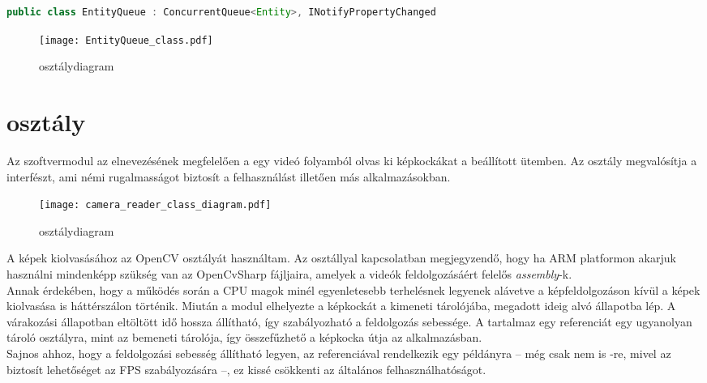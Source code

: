\begin{mdframed}[backgroundcolor=gray!20]
\begin{small}
\begin{scriptsize}
\begin{lstlisting}[language=java]
public class EntityQueue : ConcurrentQueue<Entity>, INotifyPropertyChanged
\end{lstlisting}
\end{scriptsize}
\end{small}
\end{mdframed}

\begin{figure}[h]
\texttt{[image: EntityQueue\_class.pdf]}
\centering
\caption{ osztálydiagram}
\label{fig:entity_queue_class_diagram}
\end{figure}

\section{ osztály}

Az szoftvermodul az elnevezésének megfelelően a egy videó folyamból olvas ki képkockákat a beállított ütemben. Az osztály megvalósítja a  interfészt, ami némi rugalmasságot biztosít a felhasználást illetően más alkalmazásokban. \newpage
\begin{wrapfigure}{r}{7.5cm}
\texttt{[image: camera\_reader\_class\_diagram.pdf]}
\caption{ osztálydiagram}\label{fig:camera_reader_class_diagram}
\end{wrapfigure} 
A képek kiolvasásához az OpenCV  osztályát használtam. Az osztállyal kapcsolatban megjegyzendő, hogy ha ARM platformon akarjuk használni mindenképp szükség van az OpenCvSharp  fájljaira, amelyek a videók feldolgozásáért felelős \textit{assembly}-k.\\
Annak érdekében, hogy a működés során a CPU magok minél egyenletesebb terhelésnek legyenek alávetve a képfeldolgozáson kívül a képek kiolvasása is háttérszálon történik. Miután a modul elhelyezte a képkockát a kimeneti tárolójába, megadott ideig alvó állapotba lép. A várakozási állapotban eltöltött idő hossza állítható, így szabályozható a feldolgozás sebessége. A  tartalmaz egy referenciát egy ugyanolyan tároló osztályra, mint az  bemeneti tárolója, így összefűzhető a képkocka útja az alkalmazásban.\\
Sajnos ahhoz, hogy a feldolgozási sebesség állítható legyen, az  referenciával rendelkezik egy  példányra -- még csak nem is -re, mivel az biztosít lehetőséget az FPS szabályozására --, ez kissé csökkenti az általános felhasználhatóságot.

